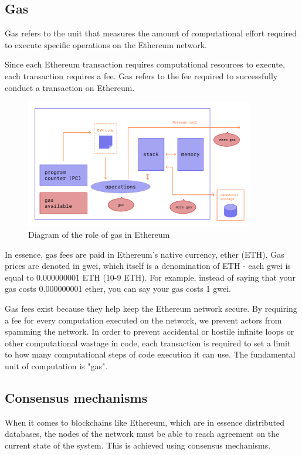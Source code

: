 \subsection{Gas}
Gas refers to the unit that measures the amount of computational effort required to execute specific operations on the Ethereum network.

Since each Ethereum transaction requires computational resources to execute, each transaction requires a fee. Gas refers to the fee required to successfully conduct a transaction on Ethereum.

\begin{figure}[h]
	\centering
		\includegraphics[width=10cm]{images/chapter2/gas.png}
		\caption{{\footnotesize Diagram of the role of gas in Ethereum \cite{TakenobuhsEthereumevmillustratedEthereum}}}
\end{figure}

In essence, gas fees are paid in Ethereum's native currency, ether (ETH). Gas prices are denoted in gwei, which itself is a denomination of ETH - each gwei is equal to 0.000000001 ETH (10-9 ETH). For example, instead of saying that your gas costs 0.000000001 ether, you can say your gas costs 1 gwei.

Gas fees exist because they help keep the Ethereum network secure. By requiring a fee for every computation executed on the network, we prevent actors from spamming the network. In order to prevent accidental or hostile infinite loops or other computational wastage in code, each transaction is required to set a limit to how many computational steps of code execution it can use. The fundamental unit of computation is "gas".

\subsection{Consensus mechanisms}
When it comes to blockchains like Ethereum, which are in essence distributed databases, the nodes of the network must be able to reach agreement on the current state of the system. This is achieved using consensus mechanisms.

